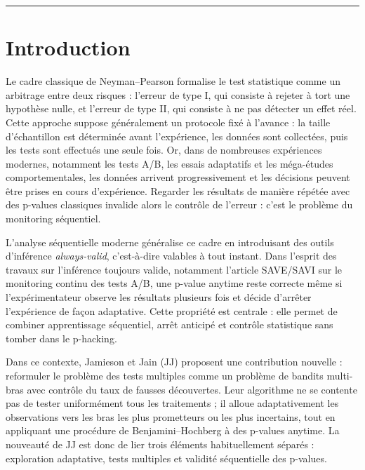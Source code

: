 \documentclass[10.5pt,a4paper]{article}
\begin{document}
\begin{abstract}
\noindent
\end{abstract}

\vspace{0.5em}
{\color{darkblue}\rule{\textwidth}{0.5pt}}
\vspace{0.5em}

\tableofcontents
\newpage

\section{Introduction}

Le cadre classique de Neyman--Pearson formalise le test statistique comme
un arbitrage entre deux risques : l'erreur de type I, qui consiste à rejeter
à tort une hypothèse nulle, et l'erreur de type II, qui consiste à ne pas
détecter un effet réel. Cette approche suppose généralement un protocole
fixé à l'avance : la taille d'échantillon est déterminée avant l'expérience,
les données sont collectées, puis les tests sont effectués une seule fois.
Or, dans de nombreuses expériences modernes, notamment les tests A/B, les
essais adaptatifs et les méga-études comportementales, les données arrivent
progressivement et les décisions peuvent être prises en cours d'expérience.
Regarder les résultats de manière répétée avec des p-values classiques
invalide alors le contrôle de l'erreur : c'est le problème du monitoring
séquentiel.

L'analyse séquentielle moderne généralise ce cadre en introduisant des
outils d'inférence \emph{always-valid}, c'est-à-dire valables à tout instant.
Dans l'esprit des travaux sur l'inférence toujours valide, notamment
l'article SAVE/SAVI sur le monitoring continu des tests A/B, une p-value
anytime reste correcte même si l'expérimentateur observe les résultats
plusieurs fois et décide d'arrêter l'expérience de façon adaptative.
Cette propriété est centrale : elle permet de combiner apprentissage
séquentiel, arrêt anticipé et contrôle statistique sans tomber dans le
p-hacking.

Dans ce contexte, Jamieson et Jain (JJ) proposent une contribution
nouvelle : reformuler le problème des tests multiples comme un problème
de bandits multi-bras avec contrôle du taux de fausses découvertes. Leur
algorithme ne se contente pas de tester uniformément tous les traitements ;
il alloue adaptativement les observations vers les bras les plus prometteurs
ou les plus incertains, tout en appliquant une procédure de
Benjamini--Hochberg à des p-values anytime. La nouveauté de JJ est donc de
lier trois éléments habituellement séparés : exploration adaptative,
tests multiples et validité séquentielle des p-values.
\end{document}
